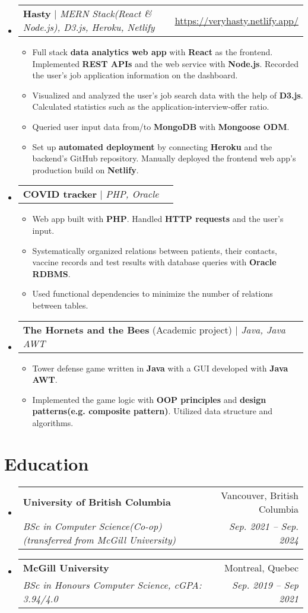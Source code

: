 \documentclass[letterpaper,11pt]{article}
\makeatletter
\newcommand{\resumeItem}[1]{
  \item\small{
    {#1 \vspace{-4pt}}
  }
}
\newcommand{\resumeSubheading}[4]{
  \vspace{-2pt}\item
    \begin{tabular*}{0.97\textwidth}[t]{l@{\extracolsep{\fill}}r}
      \textbf{#1} & #2 \\
      \textit{\small#3} & \textit{\small #4} \\
    \end{tabular*}\vspace{-7pt}
}
\newcommand{\resumeProjectHeading}[2]{
    \item
    \begin{tabular*}{0.97\textwidth}{l@{\extracolsep{\fill}}r}
      \small#1 & #2 \\
    \end{tabular*}\vspace{-7pt}
}
\newcommand{\resumeSubHeadingListStart}{\begin{itemize}[leftmargin=0.15in, label={}]}
\newcommand{\resumeSubHeadingListEnd}{\end{itemize}}
\newcommand{\resumeItemListStart}{\begin{itemize}}
\newcommand{\resumeItemListEnd}{\end{itemize}\vspace{-5pt}}
\makeatother
\begin{document}
    \resumeSubHeadingListStart
      \resumeProjectHeading
          {\textbf{Hasty} $|$ \emph{MERN Stack(React \& Node.js), D3.js, Heroku, Netlify} }{\href{https://veryhasty.netlify.app/}{\underline{https://veryhasty.netlify.app/}}
}
          \resumeItemListStart
            \resumeItem{Full stack \textbf{data analytics web app} with \textbf{React} as the frontend. Implemented \textbf{REST APIs} and the web service with \textbf{Node.js}. Recorded the user's job application information on the dashboard.}
            \resumeItem{Visualized and analyzed the user's job search data with the help of \textbf{D3.js}. Calculated statistics such as the application-interview-offer ratio.}
            \resumeItem{Queried user input data from/to \textbf{MongoDB} with \textbf{Mongoose ODM}.}
            \resumeItem{Set up \textbf{automated deployment} by connecting \textbf{Heroku} and the backend's GitHub repository. Manually deployed the frontend web app's production build on \textbf{Netlify}.}
          \resumeItemListEnd
      \resumeProjectHeading
          {\textbf{COVID tracker} $|$ \emph{PHP, Oracle} }{}
          \resumeItemListStart
            \resumeItem{Web app built with \textbf{PHP}. Handled \textbf{HTTP requests} and the user's input.}
            \resumeItem{Systematically organized relations between patients, their contacts, vaccine records and test results with database queries with \textbf{Oracle RDBMS}.}
            \resumeItem{Used functional dependencies to minimize the number of relations between tables.}
        
          \resumeItemListEnd
      \resumeProjectHeading
          {\textbf{The Hornets and the Bees }{(Academic project)} $|$ \emph{Java, Java AWT}}{}
          \resumeItemListStart
            \resumeItem{Tower defense game written in \textbf{Java} with a GUI developed with \textbf{Java AWT}.}
            \resumeItem{Implemented the game logic with \textbf{OOP principles} and \textbf{design patterns(e.g. composite pattern)}. Utilized data structure and algorithms.}
          \resumeItemListEnd
          
    \resumeSubHeadingListEnd
\section{Education}
  \resumeSubHeadingListStart
    \resumeSubheading
      {University of British Columbia}{Vancouver, British Columbia}
      {BSc in Computer Science(Co-op) (transferred from McGill University)}{Sep. 2021 -- Sep. 2024}
    \resumeSubheading
      {McGill University}{Montreal, Quebec}
      {BSc in Honours Computer Science, cGPA: 3.94/4.0}{Sep. 2019 -- Sep 2021 }
  \resumeSubHeadingListEnd
\end{document}
